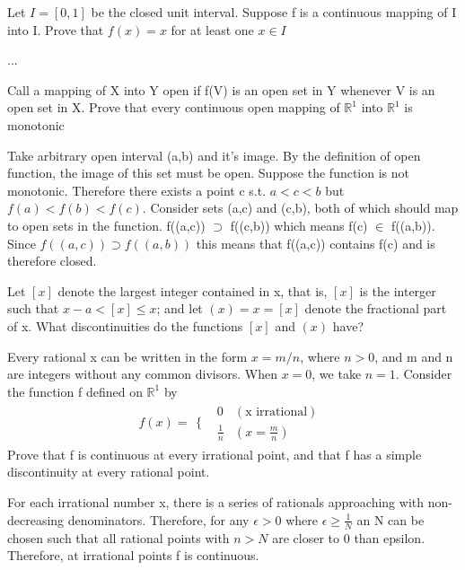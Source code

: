 \documentclass[12pt]{article}
\newenvironment{exercise}[2][Exercise]{\begin{trivlist}
\item[\hskip \labelsep {\bfseries #1}\hskip \labelsep {\bfseries #2.}]}{\end{trivlist}}
\begin{document}
\begin{exercise}{R4.14}
Let $I=[0,1]$ be the closed unit interval. Suppose f is a continuous mapping of I into I. Prove that $f(x)=x$ for at least one $x\in I$
\end{exercise}
...

\begin{exercise}{R4.15}
Call a mapping of X into Y open if f(V) is an open set in Y whenever V is an open set in X. 
Prove that every continuous open mapping of $\mathbb{R}^1$ into $\mathbb{R}^1$ is monotonic
\end{exercise}
Take arbitrary open interval (a,b) and it's image. By the definition of open function, the image of this set must be open. Suppose the function is not monotonic. Therefore there exists a point c s.t. $a < c < b$ but $f(a) < f(b) < f(c)$. Consider sets (a,c) and (c,b), both of which should map to open sets in the function. f((a,c)) $\supset$ f((c,b)) which means f(c) $\in$ f((a,b)). Since $f((a,c)) \supset f((a,b))$ this means that f((a,c)) contains f(c) and is therefore closed.

\begin{exercise}{R4.16}
Let $[x]$ denote the largest integer contained in x, that is, $[x]$ is the interger such that $x-a < [x] \leq x$; and let $(x)=x=[x]$ denote the fractional part of x. What discontinuities do the functions $[x]$ and $(x)$ have?
\end{exercise}
\begin{exercise}{R4.18}
Every rational x can be written in the form $x = m/n$, where $n>0$, and m and n are integers without any common divisors. When $x=0$, we take $n=1$. Consider the function f defined on $\mathbb{R}^1$ by $$f(x)=\begin{array}{cc}
  \{ & 
    \begin{array}{cc}
      0 & (\text{x irrational})\\
      \frac{1}{n} & (x=\frac{m}{n})
    \end{array}
\end{array}$$
Prove that f is continuous at every irrational point, and that f has a simple discontinuity at every rational point.
\end{exercise}
For each irrational number x, there is a series of rationals approaching with non-decreasing denominators. Therefore, for any $\epsilon > 0$ where $\epsilon \geq \frac{1}{N}$ an N can be chosen such that all rational points with $n > N$ are closer to 0 than epsilon. Therefore, at irrational points f is continuous.
\end{document}
